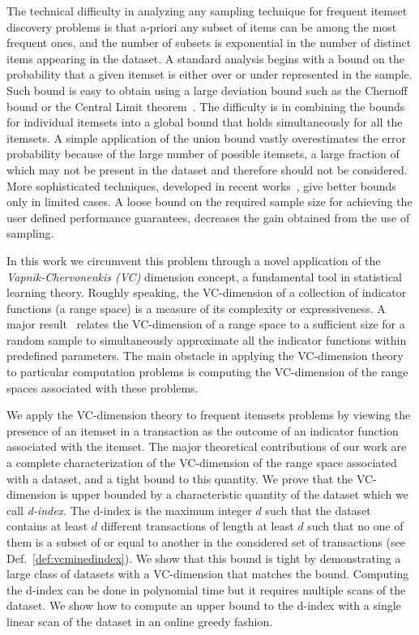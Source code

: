 The technical difficulty in analyzing any sampling technique for frequent
itemset discovery problems is that a-priori any subset of items can be among
the most frequent ones, and the number of subsets is exponential in the number
of distinct items appearing in the dataset. A standard analysis begins with a bound on
the probability that a given itemset is either over or under represented in the
sample. Such bound is easy to obtain using a large deviation bound such as the
Chernoff bound or the Central Limit theorem~\cite{MitzenmacherU05}. The
difficulty is in combining the bounds for individual itemsets
into a global bound that holds simultaneously for all the itemsets. A simple
application of the union bound vastly overestimates the error probability
because of the large number of possible itemsets, a large fraction of which may
not be present in the dataset and therefore should not be considered. More
sophisticated techniques, developed in recent
works~\cite{ChakaravarthyPS09,PietracaprinaRUV10,ChuangCY05}, give better
bounds only in limited cases. A loose bound 
 on the required sample size for achieving the user defined
 performance guarantees, decreases the gain obtained from the use of sampling. 

In this work we circumvent this problem 
through a novel application of the \emph{Vapnik-Chervonenkis (VC)} dimension
concept, a fundamental tool in statistical learning theory.  Roughly speaking,
the VC-dimension of a collection of indicator functions (a range space) is a
measure of its complexity or expressiveness. A major result~\cite{VapnikC71} relates the VC-dimension of
a range space to a sufficient size for a random sample to simultaneously
approximate all the indicator functions within predefined parameters. The main
obstacle in applying the VC-dimension theory to particular computation problems
is computing the VC-dimension of the range spaces associated with these
problems.  

We apply the VC-dimension theory to frequent itemsets problems by viewing the
presence of an itemset in a transaction as the outcome of an indicator function
associated with the itemset. The major theoretical contributions of our work are
a complete characterization of the VC-dimension of the range space associated
with a dataset, and a tight bound to this quantity. We prove that the VC-dimension
is upper bounded by a
characteristic quantity of the dataset
which we call \emph{d-index}. The d-index is the maximum integer $d$ such that the
dataset contains at least $d$ different transactions of length at least $d$ such
that no one of them is a subset of or equal to another in the considered set
of transactions (see Def.~\ref{def:vcminedindex}). We show that this bound is tight
by
demonstrating a large class of datasets with a VC-dimension that matches the
bound. Computing the d-index can be done in polynomial time but it requires
multiple scans of the dataset. We show how to compute an upper bound to the
d-index with a single linear scan of the dataset in an online greedy fashion.

